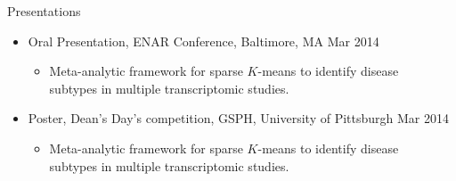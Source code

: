 \documentclass{resume} %
\begin{document}
\begin{rSection}{Presentations}
\begin{itemize}[noitemsep,topsep=0pt]
\item Oral Presentation, ENAR Conference, Baltimore, MA \hfill {Mar 2014}
\begin{itemize}[noitemsep,topsep=0pt]
\item{Meta-analytic framework for sparse $K$-means to identify disease\\ subtypes in multiple transcriptomic studies.}
\end{itemize}

\item Poster, Dean's Day's competition, GSPH, University of Pittsburgh \hfill {Mar 2014}
\begin{itemize}[noitemsep,topsep=0pt]
\item{Meta-analytic framework for sparse $K$-means to identify disease \\ subtypes in multiple transcriptomic studies.}
\end{itemize}
\end{itemize}



\end{rSection}



\end{document}
